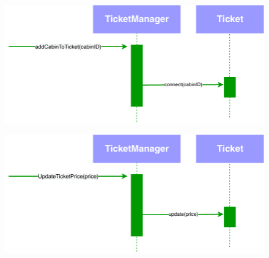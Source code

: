 \begin{figure}[H]
    \centering
\includegraphics[scale=0.5]{Iteration_3/Files/UC5_wb4.pdf}
\end{figure}
\begin{figure}[H]
    \centering
\includegraphics[scale=0.5]{Iteration_3/Files/UC5_wb5.pdf}
\end{figure}



